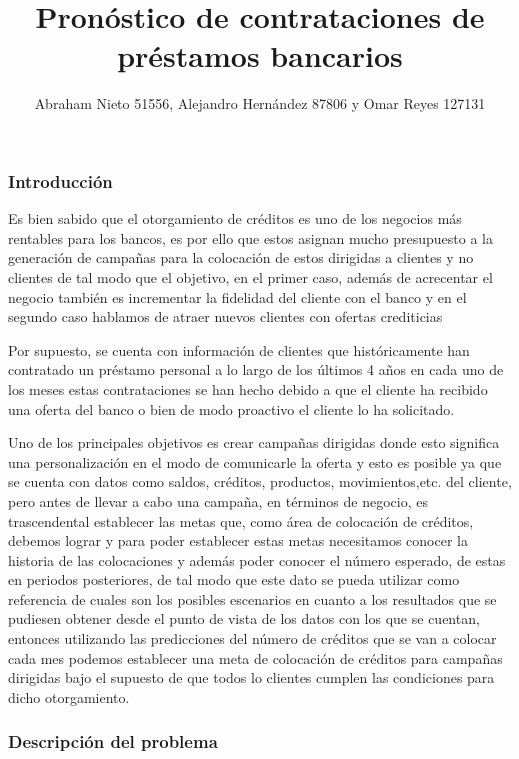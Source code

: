 \documentclass[]{article}
\title{Pronóstico de contrataciones de préstamos bancarios}
\author{Abraham Nieto 51556, Alejandro Hernández 87806 y Omar Reyes 127131}
\date{}
\begin{document}
\maketitle

\subsubsection{Introducción}\label{introduccion}

Es bien sabido que el otorgamiento de créditos es uno de los negocios
más rentables para los bancos, es por ello que estos asignan mucho
presupuesto a la generación de campañas para la colocación de estos
dirigidas a clientes y no clientes de tal modo que el objetivo, en el
primer caso, además de acrecentar el negocio también es incrementar la
fidelidad del cliente con el banco y en el segundo caso hablamos de
atraer nuevos clientes con ofertas crediticias

Por supuesto, se cuenta con información de clientes que históricamente
han contratado un préstamo personal a lo largo de los últimos 4 años en
cada uno de los meses estas contrataciones se han hecho debido a que el
cliente ha recibido una oferta del banco o bien de modo proactivo el
cliente lo ha solicitado.

Uno de los principales objetivos es crear campañas dirigidas donde esto
significa una personalización en el modo de comunicarle la oferta y esto
es posible ya que se cuenta con datos como saldos, créditos, productos,
movimientos,etc. del cliente, pero antes de llevar a cabo una campaña,
en términos de negocio, es trascendental establecer las metas que, como
área de colocación de créditos, debemos lograr y para poder establecer
estas metas necesitamos conocer la historia de las colocaciones y además
poder conocer el número esperado, de estas en periodos posteriores, de
tal modo que este dato se pueda utilizar como referencia de cuales son
los posibles escenarios en cuanto a los resultados que se pudiesen
obtener desde el punto de vista de los datos con los que se cuentan,
entonces utilizando las predicciones del número de créditos que se van a
colocar cada mes podemos establecer una meta de colocación de créditos
para campañas dirigidas bajo el supuesto de que todos lo clientes
cumplen las condiciones para dicho otorgamiento.

\subsubsection{Descripción del problema}\label{descripcion-del-problema}
\end{document}
